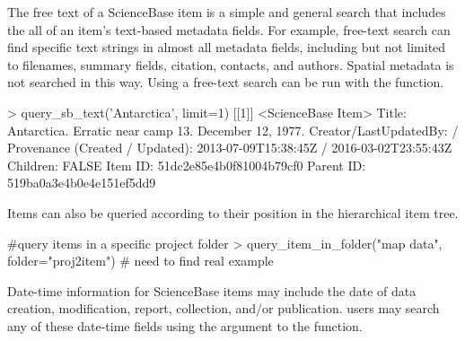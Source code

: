 The free text of a ScienceBase item is a simple and general search that 
includes the all of an item's text-based metadata fields. For example, free-text 
search can find specific text strings in almost all metadata fields, including 
but not limited to filenames, summary fields, citation, contacts, and authors. 
Spatial metadata is not searched in this way. Using  a free-text 
search can be run with the  function.

\begin{example}
> query_sb_text('Antarctica', limit=1)
[[1]]
<ScienceBase Item> 
  Title: Antarctica. Erratic near camp 13. December 12, 1977.
  Creator/LastUpdatedBy:      / 
  Provenance (Created / Updated):  2013-07-09T15:38:45Z / 2016-03-02T23:55:43Z
  Children: FALSE
  Item ID: 51dc2e85e4b0f81004b79cf0
  Parent ID: 519ba0a3e4b0e4e151ef5dd9
\end{example}

Items can also be queried according to their position in the hierarchical item
tree.

\begin{example}
#query items in a specific project folder
> query_item_in_folder("map data", folder="proj2item")
# need to find real example
\end{example}

Date-time information for ScienceBase items may include the date of
data creation, modification, report, collection, and/or
publication.  users may search any of these
date-time fields using the  argument to the
 function.

